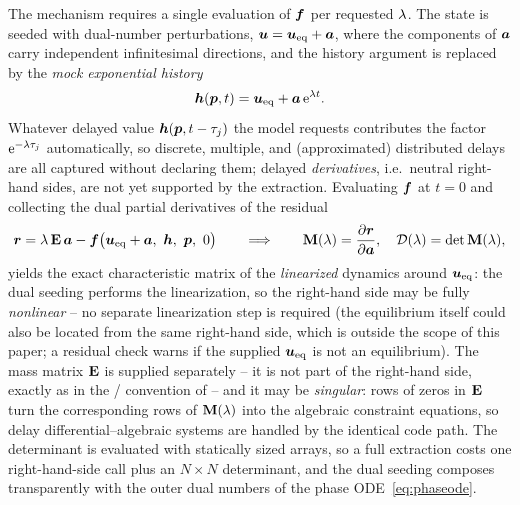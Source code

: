 The mechanism requires a single evaluation of $\boldsymbol{f}$ per requested
$\lambda$. The state is seeded with dual-number perturbations,
$\boldsymbol{u} = \boldsymbol{u}_{\mathrm{eq}} + \boldsymbol{a}$, where the components of
$\boldsymbol{a}$ carry independent infinitesimal directions, and the history
argument is replaced by the \emph{mock exponential history}
\begin{equation}\label{eq:mockhistory}
  \boldsymbol{h}(\boldsymbol{p}, t) = \boldsymbol{u}_{\mathrm{eq}} + \boldsymbol{a}\,\mathrm{e}^{\lambda t}.
\end{equation}
Whatever delayed value $\boldsymbol{h}(\boldsymbol{p}, t-\tau_j)$ the model requests
contributes the factor $\mathrm{e}^{-\lambda\tau_j}$ automatically, so discrete,
multiple, and (approximated) distributed delays are all captured without
declaring them; delayed \emph{derivatives}, i.e.\ neutral right-hand sides,
are not yet supported by the extraction. Evaluating $\boldsymbol{f}$ at $t=0$ and collecting the dual
partial derivatives of the residual
\begin{equation}\label{eq:extraction}
  \boldsymbol{r} = \lambda\,\mathbf{E}\,\boldsymbol{a} - \boldsymbol{f}\bigl(\boldsymbol{u}_{\mathrm{eq}}
      + \boldsymbol{a},\ \boldsymbol{h},\ \boldsymbol{p},\ 0\bigr)
  \qquad\Longrightarrow\qquad
  \mathbf{M}(\lambda) = \frac{\partial\boldsymbol{r}}{\partial\boldsymbol{a}},\quad
  \mathcal{D}(\lambda)=\det\mathbf{M}(\lambda),
\end{equation}
yields the exact characteristic matrix of the \emph{linearized} dynamics
around $\boldsymbol{u}_{\mathrm{eq}}$: the dual seeding performs the linearization,
so the right-hand side may be fully \emph{nonlinear} -- no separate
linearization step is required (the equilibrium itself could also be located
from the same right-hand side, which is outside the scope of this paper; a
residual check warns if the supplied $\boldsymbol{u}_{\mathrm{eq}}$ is not an
equilibrium). The mass matrix $\mathbf{E}$ is supplied separately -- it is not
part of the right-hand side, exactly as in the
/ convention of
 -- and it may be \emph{singular}: rows of
zeros in $\mathbf{E}$ turn the corresponding rows of $\mathbf{M}(\lambda)$ into the
algebraic constraint equations, so delay differential--algebraic systems are
handled by the identical code path. The determinant is evaluated with
statically sized arrays, so a full extraction costs one right-hand-side call
plus an $N\times N$ determinant, and the dual seeding composes transparently
with the outer dual numbers of the phase ODE~\eqref{eq:phaseode}.

